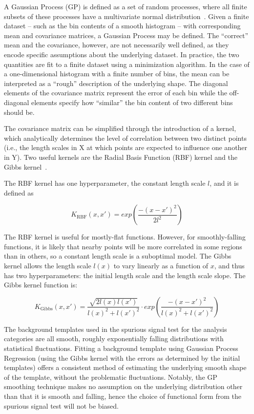 A Gaussian Process (GP) is defined as a set of random processes, where all finite subsets of these
processes have a multivariate normal distribution~\cite{ebden2015gaussian}. 
Given a finite dataset – such as the bin contents of a smooth histogram – with corresponding
mean and covariance matrices, a Gaussian Process may be defined. The “correct” mean and the
covariance, however, are not necessarily well defined, as they encode specific assumptions about
the underlying dataset. In practice, the two quantities are fit to a finite dataset using a minimization
algorithm. In the case of a one-dimensional histogram with a finite number of bins, the mean can
be interpreted as a “rough” description of the underlying shape. The diagonal elements of the
covariance matrix represent the error of each bin while the off-diagonal elements specify
how “similar” the bin content of two different bins should be.

The covariance matrix can be simplified through the introduction of a kernel, which analytically
determines the level of correlation between two distinct points (i.e., the length scales in X at which points are expected to influence one another in Y). Two useful kernels are the Radial Basis Function (RBF) kernel and the Gibbs kernel~\cite{3569,Gibbs}. 

The RBF kernel has one hyperparameter, the constant length scale $l$, and it is defined as

\begin{equation}
K_\text{RBF}(x,x') = exp\left(\frac{-(x-x')^2}{2l^2}\right)
\end{equation}

The RBF kernel is useful for mostly-flat functions. However, for smoothly-falling functions, it is likely that nearby points will be more correlated in some regions than in others, so a constant length scale is a suboptimal model. The Gibbs kernel allows the length scale $l(x)$ to vary linearly as a function of $x$, and thus has two hyperparameters: the initial length scale and the length scale slope. The Gibbs kernel function is: 

\begin{equation}
K_\text{Gibbs}(x, x') = \frac{\sqrt{2l(x)l(x')}}{l(x)^2 + l(x')^2 } \cdot exp\left( \frac{-(x-x')^2}{l(x)^2 + l(x')^2} \right)
\end{equation}


The background templates used in the spurious signal test for the analysis categories are all smooth,
roughly exponentially falling distributions with statistical fluctuations. Fitting a background template
using Gaussian Process Regression (using the Gibbs kernel with the errors as determined by the initial templates) 
offers a consistent method of estimating the underlying smooth shape of the template, without the problematic fluctuations. 
Notably, the GP smoothing technique makes no assumption on the underlying distribution other than that it is smooth and falling, hence the choice of functional form from the spurious signal test will not be biased.

